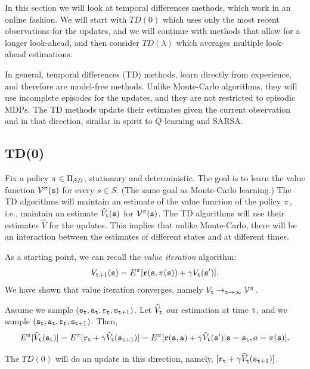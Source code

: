 In this section we will look at temporal differences methods, which
work in an online fashion. We will start with $TD(0)$ which uses
only the most recent observations for the updates, and we will
continue with methods that allow for a longer look-ahead, and then
consider $TD(\lambda)$ which averages multiple look-ahead
estimations.

In general, temporal differences (TD) methods, learn directly from
experience, and therefore are model-free methods. Unlike Monte-Carlo
algorithms, they will use incomplete episodes for the updates, and
they are not restricted to episodic MDPs. The TD methods update
their estimates given the current observation and in that direction,
similar in spirit to $Q$-learning and SARSA.

\subsection{TD(0)}

Fix a policy $\pi\in \Pi_{SD}$, stationary and deterministic. The goal
is to learn the value function $\mathcal{V}^\pi({\tt s})$ for every
$s\in S$. (The same goal as Monte-Carlo learning.) The TD algorithms
will maintain an estimate of the value function of the policy
$\pi$, i.e., maintain an estimate $\widehat{V}_{\tt t}({\tt s})$
for $\mathcal{V}^\pi({\tt s})$. The TD algorithms will use their
estimates $\widehat{V}$ for the updates. This implies that unlike
Monte-Carlo, there will be an interaction between the estimates of
different states and at different times.

As a starting point, we can recall the {\em value iteration} algorithm:
\[
V_{{\tt t}+1}({\tt s})=E^\pi[{\tt r}({\tt s},\pi({\tt s}))+\gamma
V_{\tt t}({\tt s}')].
\]
We have shown that value iteration converges, namely $V_{\tt t}
\rightarrow_{{\tt t}\rightarrow\infty} \mathcal{V}^\pi$.

Assume we sample
$({\tt s}_{\tt t},{\tt a}_{\tt t},{\tt r}_{\tt t},{\tt s}_{{\tt t}+1})$.
Let $\widehat{V}_{\tt t}$ our estimation at time ${\tt t}$,
and we sample
$({\tt s}_{\tt t},{\tt a}_{\tt t},{\tt r}_{\tt t},{\tt s}_{{\tt t}+1})$.
Then,
\[
E^\pi[\widehat{V}_{\tt t}({\tt s}_{\tt t})]=
E^\pi[{\tt r}_{\tt t}+\gamma
\widehat{V}_{\tt t}({\tt s}_{{\tt t}+1})]=E^\pi[{\tt r}({\tt s},{\tt a})+\gamma
\widehat{V}_{\tt t}({\tt s}')|{\tt s}={\tt s}_{\tt t},a=\pi({\tt s})].
\]

The $TD(0)$ will do an update in this direction, namely,
$[{\tt r}_{\tt t}+\gamma \widehat{V}_{\tt t}({\tt s}_{{\tt t}+1})]$.

